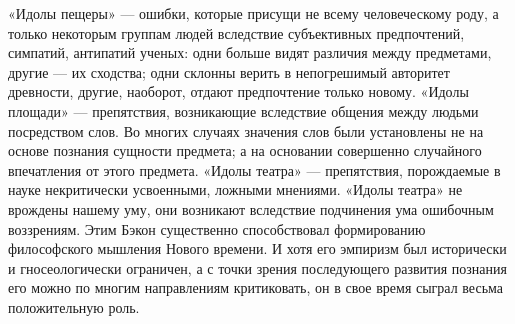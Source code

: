 \documentclass[12pt]{article}
\begin{document}
«Идолы пещеры» — ошибки, которые присущи не всему человеческому роду, а только некоторым группам
людей вследствие субъективных предпочтений, симпатий, антипатий ученых: одни больше видят различия
между предметами, другие — их сходства; одни склонны верить в непогрешимый авторитет древности, другие,
наоборот, отдают предпочтение только новому. «Идолы площади» — препятствия, возникающие вследствие
общения между людьми посредством слов. Во многих случаях значения слов были установлены не на
основе познания сущности предмета; а на основании совершенно случайного впечатления от этого предмета.
«Идолы театра» — препятствия, порождаемые в науке некритически усвоенными, ложными мнениями. «Идолы
театра» не врождены нашему уму, они возникают вследствие подчинения ума ошибочным воззрениям.
Этим Бэкон существенно способствовал формированию философского мышления Нового времени. И хотя
его эмпиризм был исторически и гносеологически ограничен, а с точки зрения последующего развития
познания его можно по многим направлениям критиковать, он в свое время сыграл весьма положительную
роль.
\end{document}
